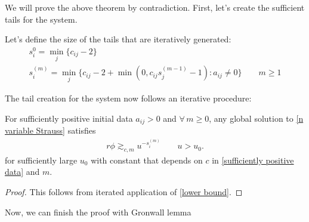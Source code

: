 \documentclass[11pt, oneside]{amsart}
\begin{document}
	We will prove the above theorem by contradiction. First, let's create the sufficient tails for the system.
	
	\begin{definition}
		Let's define the size of the tails that are iteratively generated:
		\begin{equation}\label{iteratively defined tails}
			\begin{gathered}
				s^0_i=\min_j\{c_{ij}-2\} \\
				s^{(m)}_i=\min_j\{c_{ij}-2+\min(0,c_{ij}s_j^{(m-1)}-1):a_{ij}\neq 0\} \qquad m\geq 1
			\end{gathered}
		\end{equation}
	\end{definition}
	
	
	
	The tail creation for the system now follows an iterative procedure:
	\begin{lemma}\label{iterative tail generation}
		For sufficiently positive initial data $a_{ij}>0$ and  $\forall \,m\geq0$, any global solution to \eqref{n variable Strauss} satisfies
		\begin{equation}
			\begin{gathered}
				r\phi\gtrsim_{c,m} u^{-s^{(m)}_i} \qquad u>u_0.
			\end{gathered}
		\end{equation}
		for sufficiently large $u_0$ with constant that depends on $c$ in \cref{sufficiently positive data} and $m$.
	\end{lemma}
	\begin{proof}
		This follows from iterated application of \cref{lower bound}. 	
	\end{proof}
	
	Now, we can finish the proof with Gronwall lemma
	
\end{document}
